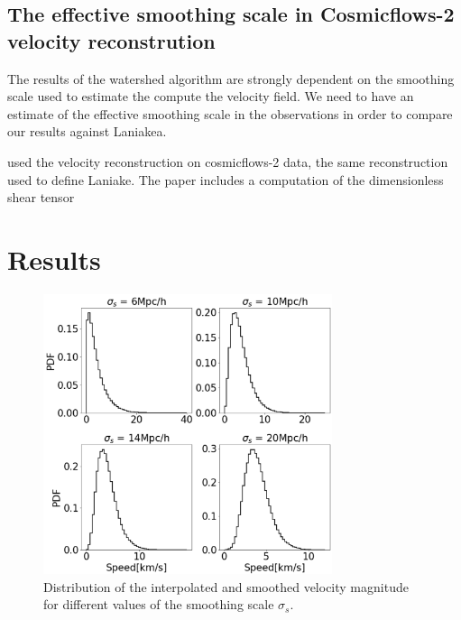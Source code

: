 \documentclass[usenatbib]{mnras}
\begin{document}
\subsection{The effective smoothing scale in Cosmicflows-2 velocity reconstrution}

The results of the watershed algorithm are strongly dependent on the
smoothing scale used to estimate the compute the velocity field.
We need to have an estimate of the effective smoothing scale in the observations in order to compare our results against Laniakea.

\cite{2015MNRAS.452.1052L} used the velocity reconstruction on cosmicflows-2 data, the same reconstruction used to define Laniake.
The paper includes a computation of the dimensionless shear tensor 

\section{Results}



\begin{figure}
    \centering
    \includegraphics[width=240pt]{smooth_vel_dist.pdf}
    \caption{Distribution of the interpolated and smoothed velocity
      magnitude for different values of the smoothing scale $\sigma_{s}$.}
    \label{fig:smooth_vel_dist}
\end{figure}
\end{document}
